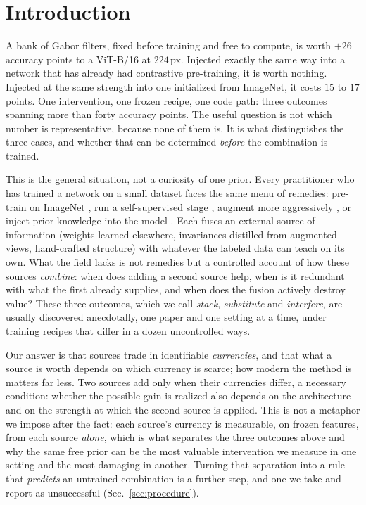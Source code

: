 \section{Introduction}\label{sec:intro}

A bank of Gabor filters, fixed before training and free to compute, is worth
$+26$ accuracy points to a ViT-B/16 at $224$\,px. Injected exactly the same way
into a network that has already had contrastive pre-training, it is worth
nothing. Injected at the same strength into one initialized from ImageNet, it
costs $15$ to $17$ points. One
intervention, one frozen recipe, one code path: three outcomes spanning more
than forty accuracy points. The useful question is not which number is representative,
because none of them is. It is what distinguishes the three cases, and whether
that can be determined \emph{before} the combination is trained.

This is the general situation, not a curiosity of one prior. Every practitioner
who has trained a network on a small dataset faces the same menu of remedies:
pre-train on ImageNet \citep{he2019rethinking}, run a self-supervised stage
\citep{chen2020simclr,caron2021dino}, augment more aggressively
\citep{touvron2021deit}, or inject prior knowledge into the model
\citep{vonrueden2023informed}. Each fuses an external source of
information (weights learned elsewhere, invariances distilled from augmented
views, hand-crafted structure) with whatever the labeled data can teach on its
own. What the field lacks is not remedies but a controlled account of how these
sources \emph{combine}: when does adding a second source help, when is it
redundant with what the first already supplies, and when does the fusion
actively destroy value? These three outcomes, which we call \emph{stack},
\emph{substitute} and \emph{interfere}, are usually discovered anecdotally, one
paper and one setting at a time, under training recipes that differ in a dozen
uncontrolled ways.

Our answer is that sources trade in identifiable \emph{currencies}, and that
what a source is worth depends on which currency is scarce; how modern the
method is matters far less. Two sources add only when their currencies differ,
a necessary condition: whether the possible gain is realized also depends on
the architecture and on the strength at which the second source is applied.
This is not a metaphor we impose after the fact: each source's currency is
measurable, on frozen features, from each source \emph{alone}, which is what
separates the three outcomes above and why the same free prior can be the most
valuable intervention we measure in one setting and the most damaging in
another. Turning that separation into a rule that \emph{predicts} an untrained
combination is a further step, and one we take and report as unsuccessful
(Sec.~\ref{sec:procedure}).

